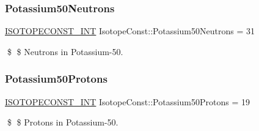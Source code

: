 \subsubsection{\texorpdfstring{Potassium50\+Neutrons}{Potassium50Neutrons}}
{\footnotesize\ttfamily \mbox{\hyperlink{group___isotope_const-_macros_ga5f18360b3e99483a35c32d789e62621c}{I\+S\+O\+T\+O\+P\+E\+C\+O\+N\+S\+T\+\_\+\+I\+NT}} Isotope\+Const\+::\+Potassium50\+Neutrons = 31}

\$ \$ Neutrons in Potassium-\/50. \mbox{\label{group___isotope_const-_potassium-_k50_ga1c509db486fdc98fbe9b1b110501a197}} 
\subsubsection{\texorpdfstring{Potassium50\+Protons}{Potassium50Protons}}
{\footnotesize\ttfamily \mbox{\hyperlink{group___isotope_const-_macros_ga5f18360b3e99483a35c32d789e62621c}{I\+S\+O\+T\+O\+P\+E\+C\+O\+N\+S\+T\+\_\+\+I\+NT}} Isotope\+Const\+::\+Potassium50\+Protons = 19}

\$ \$ Protons in Potassium-\/50. 